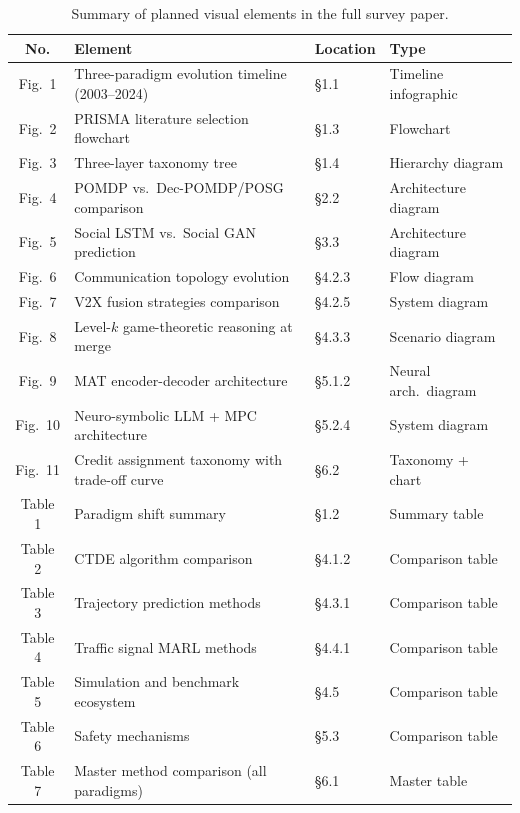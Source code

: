 \documentclass[12pt, a4paper]{article}
\begin{document}
\begin{table}[h!]
\centering
\caption{Summary of planned visual elements in the full survey paper.}
\label{tab:figures_summary}
\renewcommand{\arraystretch}{1.3}
\begin{tabular}{c l l l}
\toprule
\textbf{No.} & \textbf{Element} & \textbf{Location} & \textbf{Type} \\
\midrule
Fig.\ 1 & Three-paradigm evolution timeline (2003--2024) & \S1.1 & Timeline infographic \\
Fig.\ 2 & PRISMA literature selection flowchart & \S1.3 & Flowchart \\
Fig.\ 3 & Three-layer taxonomy tree & \S1.4 & Hierarchy diagram \\
Fig.\ 4 & POMDP vs.\ Dec-POMDP/POSG comparison & \S2.2 & Architecture diagram \\
Fig.\ 5 & Social LSTM vs.\ Social GAN prediction & \S3.3 & Architecture diagram \\
Fig.\ 6 & Communication topology evolution & \S4.2.3 & Flow diagram \\
Fig.\ 7 & V2X fusion strategies comparison & \S4.2.5 & System diagram \\
Fig.\ 8 & Level-$k$ game-theoretic reasoning at merge & \S4.3.3 & Scenario diagram \\
Fig.\ 9 & MAT encoder-decoder architecture & \S5.1.2 & Neural arch.\ diagram \\
Fig.\ 10 & Neuro-symbolic LLM + MPC architecture & \S5.2.4 & System diagram \\
Fig.\ 11 & Credit assignment taxonomy with trade-off curve & \S6.2 & Taxonomy + chart \\
\midrule
Table 1 & Paradigm shift summary & \S1.2 & Summary table \\
Table 2 & CTDE algorithm comparison & \S4.1.2 & Comparison table \\
Table 3 & Trajectory prediction methods & \S4.3.1 & Comparison table \\
Table 4 & Traffic signal MARL methods & \S4.4.1 & Comparison table \\
Table 5 & Simulation and benchmark ecosystem & \S4.5 & Comparison table \\
Table 6 & Safety mechanisms & \S5.3 & Comparison table \\
Table 7 & Master method comparison (all paradigms) & \S6.1 & Master table \\
\bottomrule
\end{tabular}
\end{table}
\end{document}
